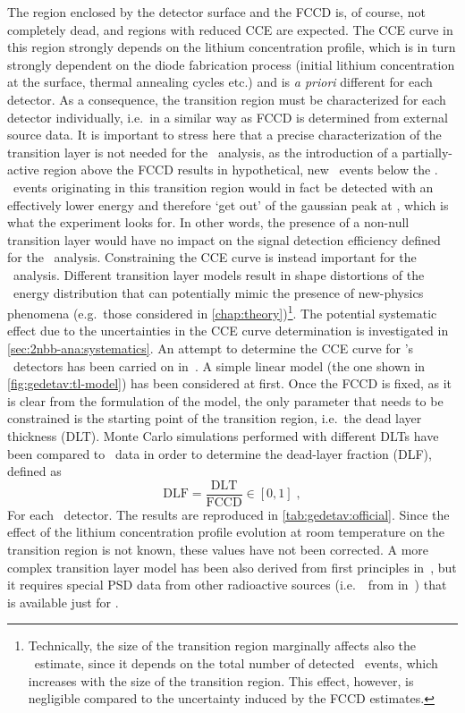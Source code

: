 The region enclosed by the detector surface and the FCCD is, of course, not completely
dead, and regions with reduced CCE are expected. The CCE curve in this region strongly
depends on the lithium concentration profile, which is in turn strongly dependent on the
diode fabrication process (initial lithium concentration at the surface, thermal annealing
cycles etc.) and is \emph{a priori} different for each detector. As a consequence, the
transition region must be characterized for each detector individually, i.e.~in a similar
way as FCCD is determined from external source data.
\newpar
It is important to stress here that a precise characterization of the transition layer is
not needed for the \onbb\ analysis, as the introduction of a partially-active region above
the FCCD results in hypothetical, new \onbb\ events below the \qbb. \onbb\ events
originating in this transition region would in fact be detected with an effectively lower
energy and therefore `get out' of the gaussian peak at \qbb, which is what the experiment
looks for. In other words, the presence of a non-null transition layer would have no
impact on the signal detection efficiency defined for the \onbb\ analysis. Constraining
the CCE curve is instead important for the \nnbb\ analysis. Different transition layer
models result in shape distortions of the \nnbb\ energy distribution that can potentially
mimic the presence of new-physics phenomena (e.g.~those considered in
\cref{chap:theory})\footnote{%
  Technically, the size of the transition region marginally affects also the \thalftwo\
  estimate, since it depends on the total number of detected \nnbb\ events, which
  increases with the size of the transition region. This effect, however, is negligible
  compared to the uncertainty induced by the FCCD estimates.
}. The potential systematic effect due to the uncertainties in the CCE curve determination
is investigated in \cref{sec:2nbb-ana:systematics}.
\newpar
An attempt to determine the CCE curve for \gerda's \bege\ detectors has been carried on
in~\cite{Lehnert2016}. A simple linear model (the one shown in
\cref{fig:gedetav:tl-model}) has been considered at first. Once the FCCD is fixed, as it
is clear from the formulation of the model, the only parameter that needs to be
constrained is the starting point of the transition region, i.e.~the dead layer thickness
(DLT). Monte Carlo simulations performed with different DLTs have been compared to \Am\
data in order to determine the dead-layer fraction (DLF), defined as
\[
  \text{DLF} = \frac{\text{DLT}}{\text{FCCD}} \in [0,1] \;,
\]
For each \bege\ detector. The results are reproduced in \cref{tab:gedetav:official}. Since
the effect of the lithium concentration profile evolution at room temperature on the
transition region is not known, these values have not been corrected. A more complex
transition layer model has been also derived from first principles in~\cite{Lehnert2016},
but it requires special PSD data from other radioactive sources (i.e.~\aoe\ from
\nuc{Sr}{90} in~\cite{Lehnert2016}) that is available just for \GD{91C}.


